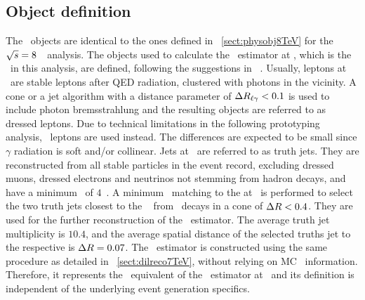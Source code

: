 \subsection{Object definition}
%
The \recolevel\ objects are identical to the ones defined in \sect~\ref{sect:physobj8TeV} for the ${\sqrt{s}}=8$~\TeV\ analysis.
%
The objects used to calculate the \mlbt\ estimator at \stablevel, which is the \truelevel\ in this analysis, are defined, following the suggestions in ~\cite{ATL-PHYS-PUB-2015-013,LHCtopWGparticlelevel}.
Usually, leptons at \stablevel\ are stable leptons after \gls{QED} radiation, clustered with photons in the vicinity. A cone or a jet algorithm with a distance parameter of $\Delta R_{\ell \gamma}<0.1$ is used to include photon bremsstrahlung and the resulting objects are referred to as dressed leptons. Due to technical limitations in the following prototyping analysis, \genlevel\ leptons are used instead. The differences are expected to be small since $\gamma$ radiation is soft and/or collinear.
Jets at \stablevel\ are referred to as truth jets. They are reconstructed from all stable particles in the event record, excluding dressed muons, dressed electrons and neutrinos not stemming from hadron decays, and have a minimum \pt\ of $4$~\GeV. A minimum \dR\ matching to the  at \genlevel\ is performed to select the two truth jets closest to the \genlevel\  from \tquark\ decays in a cone of $\Delta R<0.4$. They are used for the further reconstruction of the \mlbt\ estimator. The average truth jet multiplicity is $10.4$, and the average spatial distance of the selected truths jet to the respective  is $\Delta R=0.07$.
%
The \mlbt\ estimator is constructed using the same procedure as detailed in \sect~\ref{sect:dilreco7TeV}, without relying on \gls{MC} \genlevel\ information. Therefore, it represents the \truelevel\ equivalent of the \mlbr\ estimator at \recolevel\ and its definition is independent of the underlying event generation specifics.








